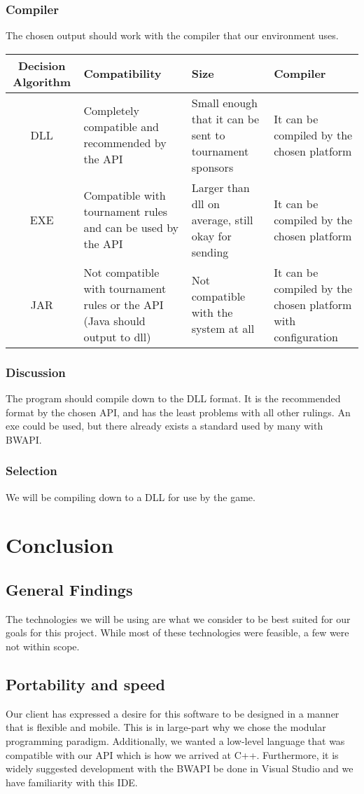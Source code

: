 \documentclass[10pt,letterpaper,onecolumn,draftclsnofoot]{IEEEtran}
\begin{document}
\subsubsection{Compiler}
The chosen output should work with the compiler that our environment uses.
\begin{center}
	\begin{tabular}{ ||C|M|M|M|| } 
		\hline
		Decision Algorithm & Compatibility & Size & Compiler \\
		\hline
		DLL & Completely compatible and recommended by the API & Small enough that it can be sent to tournament sponsors & It can be compiled by the chosen platform \\ 
		\hline
		EXE & Compatible with tournament rules and can be used by the API & Larger than dll on average, still okay for sending & It can be compiled by the chosen platform \\ 
		\hline
		JAR & Not compatible with tournament rules or the API (Java should output to dll) &Not compatible with the system at all & It can be compiled by the chosen platform with configuration \\ 
		\hline
	\end{tabular}
\end{center}
\subsubsection{Discussion}
The program should compile down to the DLL format. It is the recommended format by the chosen API, and has the least problems with all other rulings. An exe could be used, but there already exists a standard used by many with BWAPI.
\subsubsection{Selection}
We will be compiling down to a DLL for use by the game.

\section{Conclusion}
\subsection{General Findings}
The technologies we will be using are what we consider to be best suited for our goals for this project. While most of these technologies were feasible, a few were not within scope. 

\subsection{Portability and speed}
Our client has expressed a desire for this software to be designed in a manner that is flexible and mobile. This is in large-part why we chose the modular programming paradigm. Additionally, we wanted a low-level language that was compatible with our API which is how we arrived at C++. Furthermore, it is widely suggested development with the BWAPI be done in Visual Studio and we have familiarity with this IDE.
\end{document}
